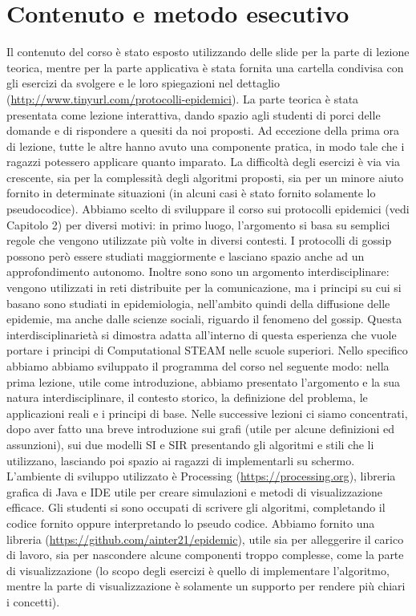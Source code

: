 \section{Contenuto e metodo esecutivo} 
Il contenuto del corso è stato esposto utilizzando delle slide per la parte di lezione teorica, mentre per la parte applicativa è stata fornita una cartella condivisa con gli esercizi da svolgere e le loro spiegazioni nel dettaglio (\href{http://www.tinyurl.com/protocolli-epidemici}{http://www.tinyurl.com/protocolli-epidemici}). La parte teorica è stata presentata come lezione interattiva, dando spazio agli studenti di porci delle domande e di rispondere a quesiti da noi proposti. Ad eccezione della prima ora di lezione, tutte le altre hanno avuto una componente pratica, in modo tale che i ragazzi potessero applicare quanto imparato. La difficoltà degli esercizi è via via crescente, sia per la complessità degli algoritmi proposti, sia per un minore aiuto fornito in determinate situazioni (in alcuni casi è stato fornito solamente lo pseudocodice). 
Abbiamo scelto di sviluppare il corso sui protocolli epidemici (vedi Capitolo 2) per diversi motivi: in primo luogo, l’argomento si basa su semplici regole che vengono utilizzate più volte in diversi contesti. I protocolli di gossip possono però essere studiati maggiormente e lasciano spazio anche ad un approfondimento autonomo. Inoltre sono sono un argomento interdisciplinare: vengono utilizzati in reti distribuite per la comunicazione, ma i principi su cui si basano sono studiati in epidemiologia, nell’ambito quindi della diffusione delle epidemie, ma anche dalle scienze sociali, riguardo il fenomeno del gossip. Questa interdisciplinarietà si dimostra adatta all’interno di questa esperienza che vuole portare i principi di Computational STEAM nelle scuole superiori.
Nello specifico abbiamo abbiamo sviluppato il programma del corso nel seguente modo: nella prima lezione, utile come introduzione, abbiamo presentato l’argomento e la sua natura interdisciplinare, il contesto storico, la definizione del problema, le applicazioni reali e i principi di base.
Nelle successive lezioni ci siamo concentrati, dopo aver fatto una breve introduzione sui grafi (utile per alcune definizioni ed assunzioni), sui due modelli SI e SIR presentando gli algoritmi e stili che li utilizzano, lasciando poi spazio ai ragazzi di implementarli su schermo. L’ambiente di sviluppo utilizzato è Processing (\href{https://processing.org}{https://processing.org}), libreria grafica di Java e IDE utile per creare simulazioni e metodi di visualizzazione efficace. Gli studenti si sono occupati di scrivere gli algoritmi, completando il codice fornito oppure interpretando lo pseudo codice. Abbiamo fornito una libreria (\href{https://github.com/ainter21/epidemic}{https://github.com/ainter21/epidemic}), utile sia per alleggerire il carico di lavoro, sia per nascondere alcune componenti troppo complesse, come la parte di visualizzazione (lo scopo degli esercizi è quello di implementare l’algoritmo, mentre la parte di visualizzazione è solamente un supporto per rendere più chiari i concetti).
